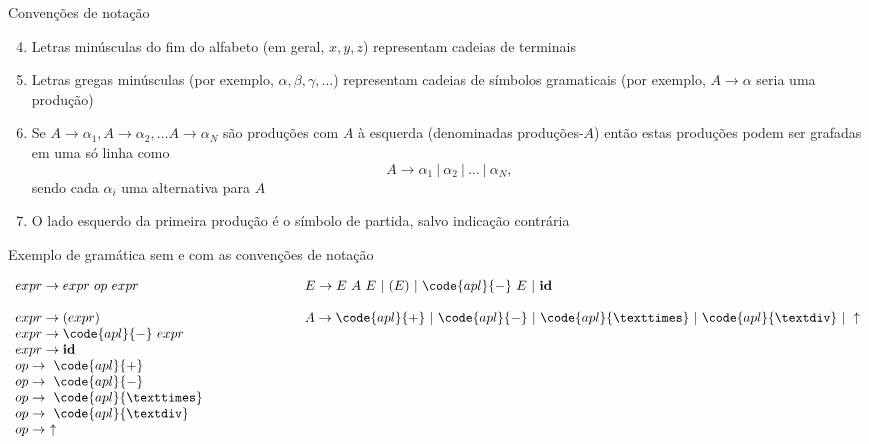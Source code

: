 \begin{frame}[fragile]{Convenções de notação}

    \begin{enumerate}
        \setcounter{enumi}{3}
        \item Letras minúsculas do fim do alfabeto (em geral, $x, y, z$) representam cadeias de terminais

        \item Letras gregas minúsculas (por exemplo, $\alpha, \beta, \gamma, \ldots$) representam cadeias de símbolos gramaticais (por exemplo, $A\to \alpha$ seria
            uma produção)

        \item Se $A\to \alpha_1, A\to \alpha_2, \ldots A\to \alpha_N$ são produções com $A$ à esquerda (denominadas produções-$A$) então estas produções podem
            ser grafadas em uma só linha como
            \[
                A\to \alpha_1\ |\ \alpha_2\ |\ \ldots \ |\ \alpha_N,
            \]
            sendo cada $\alpha_i$ uma alternativa para $A$

        \item O lado esquerdo da primeira produção é o símbolo de partida, salvo indicação contrária
    \end{enumerate}

\end{frame}

\begin{frame}[fragile]{Exemplo de gramática sem e com as convenções de notação}

\[
    \begin{array}{lp{2cm}l}
        expr \to expr\ op\ expr & \hspace{2in} & E \to E\ A\ E\ |\ (E)\ |\ \code{apl}{-}\ E\ |\ \textbf{id} \\
        expr \to (expr) & & A\to \code{apl}{+}\ |\ \code{apl}{-}\ |\ \code{apl}{×}\ |\ \code{apl}{÷}\ |\ \uparrow \\
        expr \to \code{apl}{-}\ expr \\
        expr \to \textbf{id} \\
        op \to\ \code{apl}{+} \\
        op \to\ \code{apl}{-} \\
        op \to\ \code{apl}{×} \\
        op \to\ \code{apl}{÷} \\
        op \to\ \uparrow
    \end{array}
\]

\end{frame}

